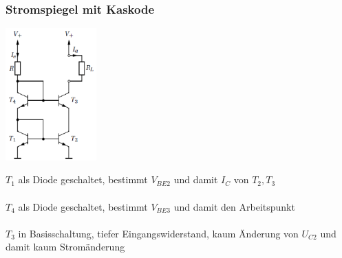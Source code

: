 \begin{multicols}{2}
		\subsubsection{Stromspiegel mit Kaskode}
			\begin{minipage}{3.5cm}
				\includegraphics[width=3.5cm]{./images/stromspiegel-kaskode} 
			\end{minipage}
			\begin{minipage}{4.5cm}
				$T_1$ als Diode geschaltet, bestimmt $V_{BE2}$ und damit $I_C$ von $T_2,T_3$ \\\\
				$T_4$ als Diode geschaltet, bestimmt $V_{BE3}$ und damit den Arbeitspunkt \\\\
				$T_3$ in Basisschaltung, tiefer Eingangswiderstand, kaum Änderung von $U_{C2}$ und damit kaum Stromänderung
			\end{minipage}
		\end{multicols}
							
